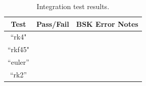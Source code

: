 \begin{table}[h]
	\caption{Integration test results.}
	\label{tbl:intResults}
	\centering \fontsize{10}{10}\selectfont
	\begin{tabular}{c | c | p{4in} } %
		\hline\hline
		\textbf{Test} 			& \textbf{Pass/Fail} 	 & \textbf{BSK Error Notes}
		\\ \hline
		``rk4"		  	&
		      	  &
		
		\\ \hline
		``rkf45"		  	&
		      	  &
		
		\\ \hline
		``euler''	   	           	&
		           		&      
		  
		\\ \hline
		``rk2''      	&
		
		&
		
		\\
		\hline\hline
	\end{tabular}
\end{table}

